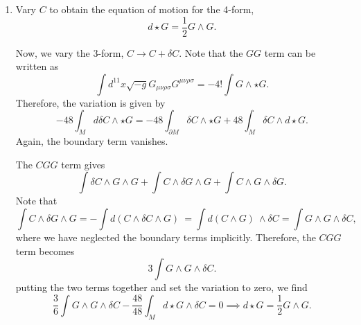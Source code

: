 \begin{enumerate}[label=\textbf{\roman*)}]
    \item Vary $C$ to obtain the equation of motion for the 4-form,
    \begin{equation}
        d\star G = \frac{1}{2}G\wedge G.
    \end{equation}
    \begin{solution}
        Now, we vary the 3-form, $C\to C + \delta C$. Note that the $GG$ term can be written as 
        \begin{equation}
            \int d^{11}x\sqrt{-g}G_{\mu\nu\rho\sigma}G^{\mu\nu\rho\sigma}=-4!\int G\wedge \star G.
        \end{equation}
        Therefore, the variation is given by
        \begin{equation}
            -48\int_M d\delta C \wedge \star G = -48\int_{\partial M} \delta C \wedge \star G + 48\int_M\delta C\wedge d \star G.
        \end{equation}
        Again, the boundary term vanishes.

        The $CGG$ term gives
        \begin{equation}
            \int\delta C\wedge G \wedge G + \int C\wedge \delta G \wedge G + \int C\wedge G \wedge \delta G.
        \end{equation}
        Note that
        \begin{equation}
            \int C\wedge \delta G \wedge G = -\int d(C\wedge \delta C \wedge G)\ = \int d(C\wedge G)\ \wedge \delta C =  \int G\wedge G \wedge  \delta C,
        \end{equation}
        where we have neglected the boundary terms implicitly.
        Therefore, the $CGG$ term becomes
        \begin{equation}
            3\int G\wedge G \wedge  \delta C.
        \end{equation}
        putting the two terms together and set the variation to zero, we find
        \begin{equation}
            \frac{3}{6}\int G\wedge G \wedge  \delta C -\frac{48}{48}\int_M d \star G\wedge\delta C = 0 \implies d \star G = \frac{1}{2}G\wedge G.
        \end{equation}
    \end{solution}
\end{enumerate}
